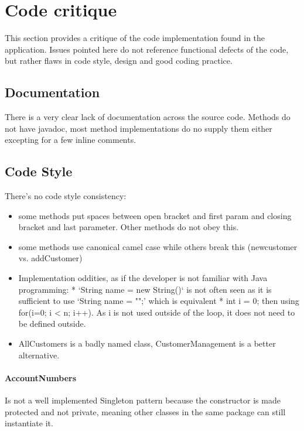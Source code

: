 \pagebreak
\section{Code critique}
\label{app:code-critique}

This section provides a critique of the code implementation found in the application. Issues pointed here do not reference functional defects of the code, but rather flaws in code style, design and good coding practice. 

\subsection{Documentation}
There is a very clear lack of documentation across the source code. Methods do not have javadoc, most method implementations do no supply them either excepting for a few inline comments. 

\subsection{Code Style}
There's no code style consistency: 
\begin{itemize}
    \item some methods put spaces between open bracket and first param and closing bracket and last parameter. Other methods do not obey this. 
    \item some methods use canonical camel case while others break this (newcustomer vs. addCustomer)
    \item Implementation oddities, as if the developer is not familiar with Java programming: 
        * `String name = new String()` is not often seen as it is sufficient to use `String name = "";' which is equivalent
        * int i = 0; then using for(i=0; i < n; i++). As i is not used outside of the loop, it does not need to be defined outside. 
    \item AllCustomers is a badly named class, CustomerManagement is a better alternative. 
\end{itemize}
\paragraph{AccountNumbers}
Is not a well implemented Singleton pattern because the constructor is made protected and not private, meaning other classes in the same package can still instantiate it.
